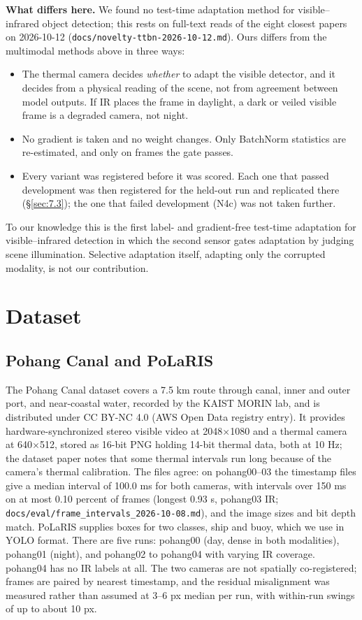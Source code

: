 \documentclass[10pt]{article}
\begin{document}
\textbf{What differs here.} We found no test-time adaptation method for visible--infrared object detection; this rests on full-text reads of the eight closest papers on 2026-10-12 (\texttt{docs/\allowbreak{}novelty-ttbn-2026-10-12.md}). Ours differs from the multimodal methods above in three ways:
\begin{itemize}
\item The thermal camera decides \emph{whether} to adapt the visible detector, and it decides from a physical reading of the scene, not from agreement between model outputs. If IR places the frame in daylight, a dark or veiled visible frame is a degraded camera, not night.
\item No gradient is taken and no weight changes. Only BatchNorm statistics are re-estimated, and only on frames the gate passes.
\item Every variant was registered before it was scored. Each one that passed development was then registered for the held-out run and replicated there (\S\ref{sec:7.3}); the one that failed development (N4c) was not taken further.
\end{itemize}

To our knowledge this is the first label- and gradient-free test-time adaptation for visible--infrared detection in which the second sensor gates adaptation by judging scene illumination. Selective adaptation itself, adapting only the corrupted modality, is not our contribution.

\section{Dataset}\label{sec:3}
\subsection{Pohang Canal and PoLaRIS}\label{sec:3.1}
The Pohang Canal dataset \citep{chung2023pohang} covers a 7.5 km route through canal, inner and outer port, and near-coastal water, recorded by the KAIST MORIN lab, and is distributed under CC BY-NC 4.0 (AWS Open Data registry entry). It provides hardware-synchronized stereo visible video at 2048$\times$1080 and a thermal camera at 640$\times$512, stored as 16-bit PNG holding 14-bit thermal data, both at 10 Hz; the dataset paper notes that some thermal intervals run long because of the camera's thermal calibration. The files agree: on pohang00--03 the timestamp files give a median interval of 100.0 ms for both cameras, with intervals over 150 ms on at most 0.10 percent of frames (longest 0.93 s, pohang03 IR; \texttt{docs/\allowbreak{}eval/\allowbreak{}frame\_\allowbreak{}intervals\_\allowbreak{}2026-10-08.md}), and the image sizes and bit depth match. PoLaRIS \citep{choi2025polaris} supplies boxes for two classes, ship and buoy, which we use in YOLO format. There are five runs: pohang00 (day, dense in both modalities), pohang01 (night), and pohang02 to pohang04 with varying IR coverage. pohang04 has no IR labels at all. The two cameras are not spatially co-registered; frames are paired by nearest timestamp, and the residual misalignment was measured rather than assumed at 3--6 px median per run, with within-run swings of up to about 10 px.
\end{document}
